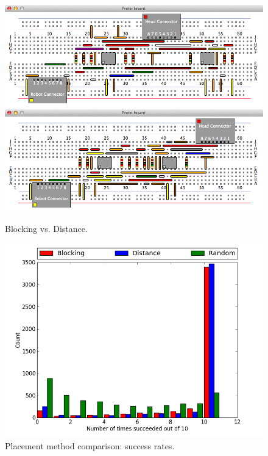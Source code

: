 \begin{figure}[H]
\begin{center}
\includegraphics[width=\textwidth]{Images/exemplar_per_pair_decreasing.png}
\includegraphics[width=\textwidth]{Images/exemplar_distance.png}
\caption{Blocking vs. Distance.}
\end{center}
\end{figure}

\begin{figure}[H]
\begin{center}
\includegraphics[width=\textwidth]{Images/placement_success_comparison.png}
\caption{Placement method comparison: success rates.}
\label{fig:placement_success}
\end{center}
\end{figure}

